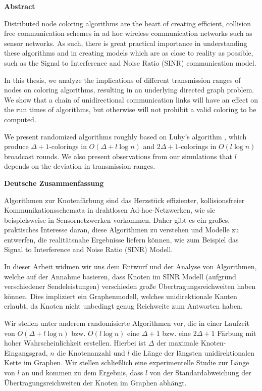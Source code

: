 \documentclass{thesisclass}
\begin{document}
\begin{addmargin}{0.5cm}

\centerline{\bf Abstract}

Distributed node coloring algorithms are the heart of creating efficient, collision free communication schemes in ad hoc wireless communication networks such as sensor networks. As such, there is great practical importance in understanding these algorithms and in creating models which are as close to reality as possible, such as the Signal to Interference and Noise Ratio (SINR) communication model.

In this thesis, we analyze the implications of different transmission ranges of nodes on coloring algorithms, resulting in an underlying directed graph problem. We show that a chain of unidirectional communication links will have an effect on the run times of algorithms, but otherwise will not prohibit a valid coloring to be computed.

We present randomized algorithms roughly based on Luby's algorithm \cite{luby1986simple}, which produce $\Delta+1$-colorings in $O(\Delta + l \log n)$ and $2\Delta+1$-colorings in $O(l \log n)$ broadcast rounds. We also present observations from our simulations that $l$ depends on the deviation in transmission ranges.

\vskip 2cm

\centerline{\normalfont \bfseries Deutsche Zusammenfassung}

\noindent Algorithmen zur Knotenfärbung sind das Herzstück effizienter, kollisionsfreier Kommunikationsschemata in drahtlosen Ad-hoc-Netzwerken, wie sie beispielsweise in Sensornetzwerken vorkommen. Daher gibt es ein großes, praktisches Interesse daran, diese Algorithmen zu verstehen und Modelle zu entwerfen, die realitätsnahe Ergebnisse liefern können, wie zum Beispiel das Signal to Interference and Noise Ratio (SINR) Modell.

\noindent In dieser Arbeit widmen wir uns dem Entwurf und der Analyse von Algorithmen, welche auf der Annahme basieren, dass Knoten im SINR Modell (aufgrund verschiedener Sendeleistungen) verschieden große Übertragungsreichweiten haben können. Dies impliziert ein Graphenmodell, welches unidirektionale Kanten erlaubt, da Knoten nicht unbedingt genug Reichweite zum Antworten haben.

\noindent Wir stellen unter anderem randomisierte Algorithmen vor, die in einer Laufzeit von $O(\Delta + l \log n)$ bzw. $O(l \log n)$ eine $\Delta+1$ bzw. eine $2\Delta+1$ Färbung mit hoher Wahrscheinlichkeit erstellen. Hierbei ist $\Delta$ der maximale Knoten-Eingangsgrad, $n$ die Knotenanzahl und $l$ die Länge der längsten unidirektionalen Kette im Graphen. Wir stellen schließlich eine experimentelle Studie zur Länge von $l$ an und kommen zu dem Ergebnis, dass $l$ von der Standardabweichung der Übertragungsreichweiten der Knoten im Graphen abhängt.

\end{addmargin}
\end{document}
